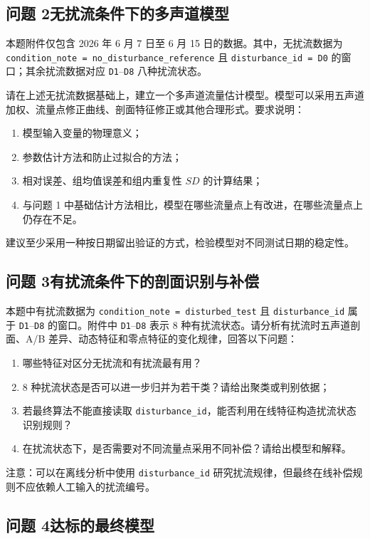 \documentclass[UTF8,a4paper,11pt]{ctexart}
\begin{document}
\subsection*{问题 2\quad 无扰流条件下的多声道模型}

本题附件仅包含 2026 年 6 月 7 日至 6 月 15 日的数据。其中，无扰流数据为 \texttt{condition\_note = no\_disturbance\_reference} 且 \texttt{disturbance\_id = D0} 的窗口；其余扰流数据对应 \texttt{D1}--\texttt{D8} 八种扰流状态。

请在上述无扰流数据基础上，建立一个多声道流量估计模型。模型可以采用五声道加权、流量点修正曲线、剖面特征修正或其他合理形式。要求说明：
\begin{enumerate}
  \item 模型输入变量的物理意义；
  \item 参数估计方法和防止过拟合的方法；
  \item 相对误差、组均值误差和组内重复性 $SD$ 的计算结果；
  \item 与问题 1 中基础估计方法相比，模型在哪些流量点上有改进，在哪些流量点上仍存在不足。
\end{enumerate}

建议至少采用一种按日期留出验证的方式，检验模型对不同测试日期的稳定性。

\subsection*{问题 3\quad 有扰流条件下的剖面识别与补偿}

本题中有扰流数据为 \texttt{condition\_note = disturbed\_test} 且 \texttt{disturbance\_id} 属于 \texttt{D1}--\texttt{D8} 的窗口。附件中 \texttt{D1}--\texttt{D8} 表示 8 种有扰流状态。请分析有扰流时五声道剖面、A/B 差异、动态特征和零点特征的变化规律，回答以下问题：
\begin{enumerate}
  \item 哪些特征对区分无扰流和有扰流最有用？
  \item 8 种扰流状态是否可以进一步归并为若干类？请给出聚类或判别依据；
  \item 若最终算法不能直接读取 \texttt{disturbance\_id}，能否利用在线特征构造扰流状态识别规则？
  \item 在扰流状态下，是否需要对不同流量点采用不同补偿？请给出模型和解释。
\end{enumerate}

注意：可以在离线分析中使用 \texttt{disturbance\_id} 研究扰流规律，但最终在线补偿规则不应依赖人工输入的扰流编号。

\subsection*{问题 4\quad 达标的最终模型}
\end{document}
